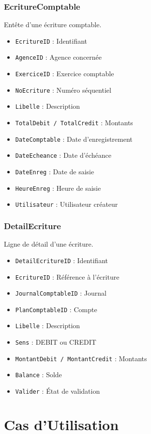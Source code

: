 \documentclass[12pt]{report}
\begin{document}
\subsubsection{EcritureComptable}
Entête d'une écriture comptable.
\begin{itemize}
    \item \texttt{EcritureID} : Identifiant
    \item \texttt{AgenceID} : Agence concernée
    \item \texttt{ExerciceID} : Exercice comptable
    \item \texttt{NoEcriture} : Numéro séquentiel
    \item \texttt{Libelle} : Description
    \item \texttt{TotalDebit / TotalCredit} : Montants
    \item \texttt{DateComptable} : Date d'enregistrement
    \item \texttt{DateEcheance} : Date d'échéance
    \item \texttt{DateEnreg} : Date de saisie
    \item \texttt{HeureEnreg} : Heure de saisie
    \item \texttt{Utilisateur} : Utilisateur créateur
\end{itemize}

\subsubsection{DetailEcriture}
Ligne de détail d'une écriture.
\begin{itemize}
    \item \texttt{DetailEcritureID} : Identifiant
    \item \texttt{EcritureID} : Référence à l'écriture
    \item \texttt{JournalComptableID} : Journal
    \item \texttt{PlanComptableID} : Compte
    \item \texttt{Libelle} : Description
    \item \texttt{Sens} : DEBIT ou CREDIT
    \item \texttt{MontantDebit / MontantCredit} : Montants
    \item \texttt{Balance} : Solde
    \item \texttt{Valider} : État de validation
\end{itemize}

\section{Cas d'Utilisation}
\end{document}
